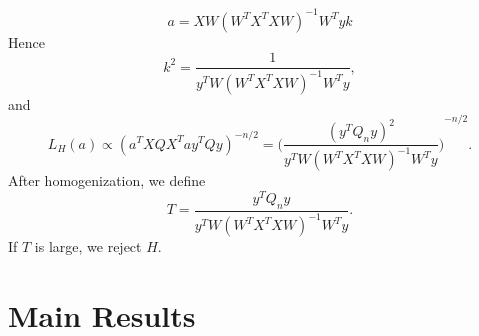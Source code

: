\documentclass[review]{elsarticle}
\theoremstyle{plain}
\theoremstyle{definition}
\theoremstyle{remark}
\begin{document}
    \begin{equation*}
        a=XW{(W^T X^T X W)}^{-1} W^T y k 
    \end{equation*}
    Hence 
    \begin{equation*}
        k^2=\frac{1}{y^T W{(W^T X^T X W)}^{-1} W^T y},
    \end{equation*}
    and 
    \begin{equation*}
        L_H (a)\propto {(a^T X Q X^T a y^T Q y)}^{-n/2}={\Big(\frac{{(y^T Q_n y)}^2}{y^T W{(W^T X^T X W)}^{-1} W^T y}\Big)}^{-n/2}.
    \end{equation*}
After homogenization, we define
\[
    T=\frac{y^T Q_n y}{
        y^T W{(W^T X^T X W)}^{-1}W^T y
    }.
    \]
If $T$ is large, we reject $H$.












\section{Main Results}
\end{document}
